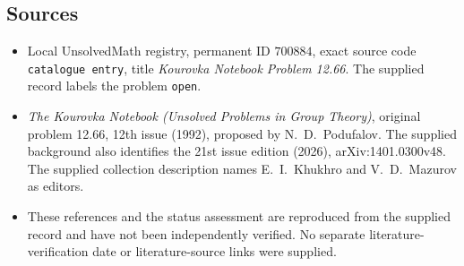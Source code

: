 \documentclass[11pt]{article}
\begin{document}
\subsection{Sources}
\begin{itemize}
\item Local UnsolvedMath registry, permanent ID \(700884\), exact source code \texttt{catalogue entry}, title \emph{Kourovka Notebook Problem 12.66}. The supplied record labels the problem \texttt{open}.
\item \emph{The Kourovka Notebook (Unsolved Problems in Group Theory)}, original problem 12.66, 12th issue (1992), proposed by N.\ D.\ Podufalov. The supplied background also identifies the 21st issue edition (2026), arXiv:1401.0300v48. The supplied collection description names E.\ I.\ Khukhro and V.\ D.\ Mazurov as editors.
\item These references and the status assessment are reproduced from the supplied record and have not been independently verified. No separate literature-verification date or literature-source links were supplied.
\end{itemize}
\end{document}
